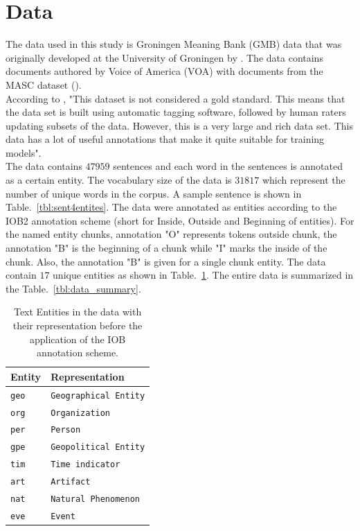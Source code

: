 \documentclass[sigconf, nonacm, natbib, screen, balance=False]{acmart}
\begin{document}
\section{Data}
The data used in this study is Groningen Meaning Bank (GMB) data that was originally developed at the University of Groningen by \citep{Bos2017GMB, gmbcorpus}. The data contains documents authored by Voice of America (VOA) with documents from the MASC dataset (\citep{Ide2008MASCTM}). 
\hfill\\
According to \citep{asheshnlp}, "This dataset is not considered a gold standard. This means that the data set is built using automatic tagging software, followed by human raters updating subsets of the data. However, this is a very large and rich data set. This data has a lot of useful annotations that make it quite suitable for training models". 
\hfill\\
The data contains $47959$ sentences and each word in the sentences is annotated as a certain entity. The vocabulary size of the data is $31817$ which represent the number of unique words in the corpus. A sample sentence is shown in Table.~\ref{tbl:sent4entites}. The data were annotated as entities according to the IOB2 annotation scheme (short for Inside, Outside and Beginning of entities). For the named entity chunks, annotation "O" represents tokens outside chunk, the annotation "B" is the beginning of a chunk while "I" marks the inside of the chunk. Also, the annotation "B" is given for a single chunk entity. The data contain $17$ unique entities as shown in Table.~\ref{tbl:entites}. The entire data is summarized in the Table.~\ref{tbl:data_summary}.

\begin{table}
  \caption{Text Entities in the data with their representation before the application of the IOB annotation scheme.}
  \label{tbl:entites}
  \begin{tabular}{ll}  
    \hline
    Entity & Representation \\\hline
    \verb!geo! & \verb!Geographical Entity! \\
    \verb!org! & \verb!Organization! \\
    \verb!per! & \verb!Person! \\
    \verb!gpe! & \verb!Geopolitical Entity! \\
    \verb!tim! & \verb!Time indicator! \\
    \verb!art! & \verb!Artifact! \\
    \verb!nat! & \verb!Natural Phenomenon! \\
    \verb!eve! & \verb!Event! \\\hline
  \end{tabular}
\end{table}
\end{document}
